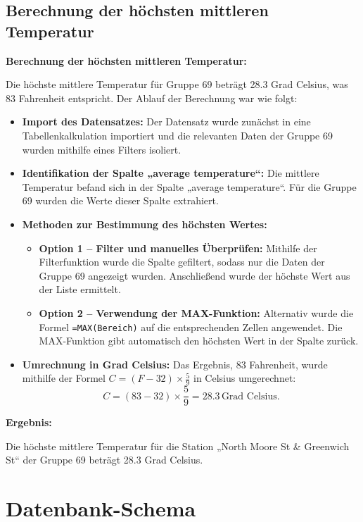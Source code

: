 \documentclass{article}
\begin{document}
\newpage 

\subsection{Berechnung der höchsten mittleren Temperatur}
\label{sec:berechnung-temperatur}

\textbf{Berechnung der höchsten mittleren Temperatur:}

Die höchste mittlere Temperatur für Gruppe 69 beträgt 28.3 Grad Celsius, was 83 Fahrenheit entspricht. Der Ablauf der Berechnung war wie folgt:
\begin{itemize}
    \item \textbf{Import des Datensatzes:} Der Datensatz wurde zunächst in eine Tabellenkalkulation importiert und die relevanten Daten der Gruppe 69 wurden mithilfe eines Filters isoliert.
    \item \textbf{Identifikation der Spalte „average temperature“:} Die mittlere Temperatur befand sich in der Spalte „average temperature“. Für die Gruppe 69 wurden die Werte dieser Spalte extrahiert.
    \item \textbf{Methoden zur Bestimmung des höchsten Wertes:}
    \begin{itemize}
        \item \textbf{Option 1 – Filter und manuelles Überprüfen:} Mithilfe der Filterfunktion wurde die Spalte gefiltert, sodass nur die Daten der Gruppe 69 angezeigt wurden. Anschließend wurde der höchste Wert aus der Liste ermittelt.
        \item \textbf{Option 2 – Verwendung der MAX-Funktion:} Alternativ wurde die Formel \texttt{=MAX(Bereich)} auf die entsprechenden Zellen angewendet. Die MAX-Funktion gibt automatisch den höchsten Wert in der Spalte zurück.
    \end{itemize}
    \item \textbf{Umrechnung in Grad Celsius:} Das Ergebnis, 83 Fahrenheit, wurde mithilfe der Formel $C = (F - 32) \times \frac{5}{9}$ in Celsius umgerechnet:
    \[
    C = (83 - 32) \times \frac{5}{9} = 28.3 \, \text{Grad Celsius}.
    \]
\end{itemize}

\textbf{Ergebnis:}

Die höchste mittlere Temperatur für die Station „North Moore St \& Greenwich St“ der Gruppe 69 beträgt 28.3 Grad Celsius.

\newpage 
\newpage 


\section{Datenbank-Schema}
\label{sec:datenbank-schema}
\end{document}
